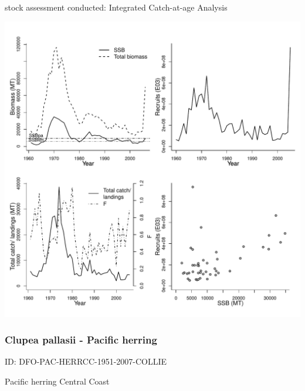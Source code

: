 stock assessment conducted: Integrated Catch-at-age Analysis 
\begin{center}
\vspace{-0.2cm}\includegraphics[scale=0.65]{../tex/figures/plot-HAWG-HERRNIRS-1960-2006-JENNINGS.pdf}
\end{center}

\newpage
\subsubsection{Clupea pallasii - Pacific herring}
ID: DFO-PAC-HERRCC-1951-2007-COLLIE

Pacific herring Central Coast 

